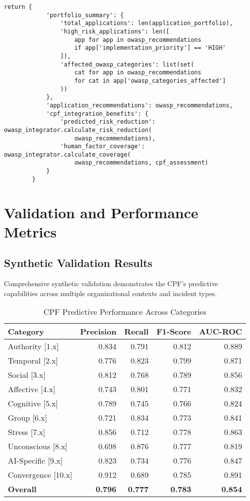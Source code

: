 \documentclass[10pt,twocolumn]{IEEEtran}
\begin{document}
\begin{lstlisting}[caption={Enterprise Integration API Specification}]
        return {
            'portfolio_summary': {
                'total_applications': len(application_portfolio),
                'high_risk_applications': len([
                    app for app in owasp_recommendations 
                    if app['implementation_priority'] == 'HIGH'
                ]),
                'affected_owasp_categories': list(set(
                    cat for app in owasp_recommendations 
                    for cat in app['owasp_categories_affected']
                ))
            },
            'application_recommendations': owasp_recommendations,
            'cpf_integration_benefits': {
                'predicted_risk_reduction': owasp_integrator.calculate_risk_reduction(
                    owasp_recommendations),
                'human_factor_coverage': owasp_integrator.calculate_coverage(
                    owasp_recommendations, cpf_assessment)
            }
        }
\end{lstlisting}

\section{Validation and Performance Metrics}

\subsection{Synthetic Validation Results}

Comprehensive synthetic validation demonstrates the CPF's predictive capabilities across multiple organizational contexts and incident types.

\begin{table}[h]
\centering
\caption{CPF Predictive Performance Across Categories}
\label{tab:category_performance}
\begin{tabular}{@{}lrrrr@{}}
\toprule
\textbf{Category} & \textbf{Precision} & \textbf{Recall} & \textbf{F1-Score} & \textbf{AUC-ROC} \\
\midrule
Authority [1.x] & 0.834 & 0.791 & 0.812 & 0.889 \\
Temporal [2.x] & 0.776 & 0.823 & 0.799 & 0.871 \\
Social [3.x] & 0.812 & 0.768 & 0.789 & 0.856 \\
Affective [4.x] & 0.743 & 0.801 & 0.771 & 0.832 \\
Cognitive [5.x] & 0.789 & 0.745 & 0.766 & 0.824 \\
Group [6.x] & 0.721 & 0.834 & 0.773 & 0.841 \\
Stress [7.x] & 0.856 & 0.712 & 0.778 & 0.863 \\
Unconscious [8.x] & 0.698 & 0.876 & 0.777 & 0.819 \\
AI-Specific [9.x] & 0.823 & 0.734 & 0.776 & 0.847 \\
Convergence [10.x] & 0.912 & 0.689 & 0.785 & 0.891 \\
\midrule
\textbf{Overall} & \textbf{0.796} & \textbf{0.777} & \textbf{0.783} & \textbf{0.854} \\
\bottomrule
\end{tabular}
\end{table}
\end{document}
